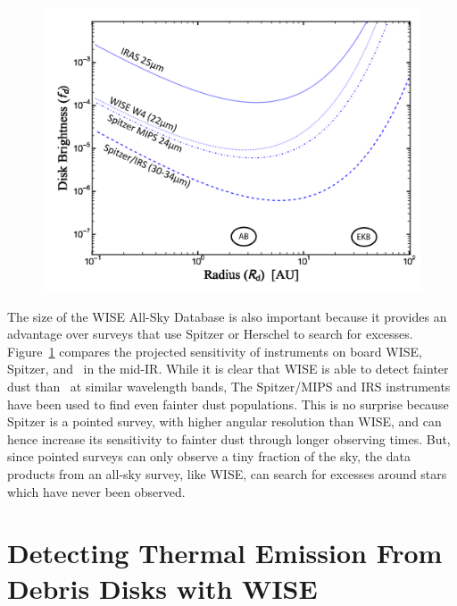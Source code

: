     
    \begin{figure}
    \centering
    \includegraphics[scale=0.5]{Ch2/fdd_vs_tbb}
    \caption[]{}
    \label{fig:sensitivity_all}
    \end{figure}

    
    
    The size of the WISE All-Sky Database is also important because it provides an advantage over surveys that use Spitzer or Herschel to search for excesses. Figure~\ref{fig:sensitivity_all} compares the projected sensitivity of instruments on board WISE, Spitzer, and \iras\ in the mid-IR. While it is clear that WISE is able to detect fainter dust than \iras\ at similar wavelength bands, The Spitzer/MIPS and IRS instruments have been used to find even fainter dust populations. This is no surprise because Spitzer is a pointed survey, with higher angular resolution than WISE, and can hence increase its sensitivity to fainter dust through longer observing times. But, since pointed surveys can only observe a tiny fraction of the sky, the data products from an all-sky survey, like WISE, can search for excesses around stars which have never been observed. 
    
    
    
\section{Detecting Thermal Emission From Debris Disks with WISE}

